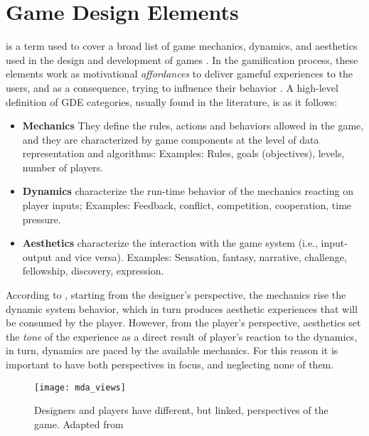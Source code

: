 \section{Game Design Elements}
\label{sec:Game_Design_Elements}

 is a term used to cover a broad list of game mechanics, dynamics, and aesthetics used in the design and development of games \cite{kapp2012gamification,Gamification_of_Collaborative_Learning}. In the gamification process, these elements work as motivational \textit{affordances} to deliver gameful experiences to the users, and as a consequence, trying to influence their behavior \cite{Does_Gamification_Work}. 
A high-level definition of GDE categories, usually found in the literature, is as it follows: 

\begin{itemize}
\item \textbf{Mechanics} They define the rules, actions and behaviors allowed in the game, and they are characterized by game components at the level of data representation and algorithms:
\subitem Examples: Rules, goals (objectives), levels, number of players. 
\item \textbf{Dynamics} characterize the run-time behavior of the mechanics reacting on player inputs;
\subitem Examples: Feedback, conflict, competition, cooperation, time pressure.
\item \textbf{Aesthetics} characterize the interaction with the game system (i.e., input-output and vice versa).
\subitem Examples: Sensation, fantasy, narrative, challenge, fellowship, discovery, expression.
\end{itemize}

According to \citeauthor{hunicke2004}, starting from the designer’s perspective,
the mechanics rise the dynamic system behavior, which in turn produces aesthetic experiences that will be consumed by the player.
However, from the player’s perspective, aesthetics set the \textit{tone} of the experience as a direct result of player's reaction to the dynamics, in turn, dynamics are paced by the available mechanics. For this reason it is important to have both perspectives in focus, and neglecting none of them.

\begin{figure}[h!]
\caption{Designers and players have different, but linked, perspectives of the game. Adapted from \cite{hunicke2004}}
\centering
\texttt{[image: mda\_views]}
\label{fig:mda_views}
\end{figure}

